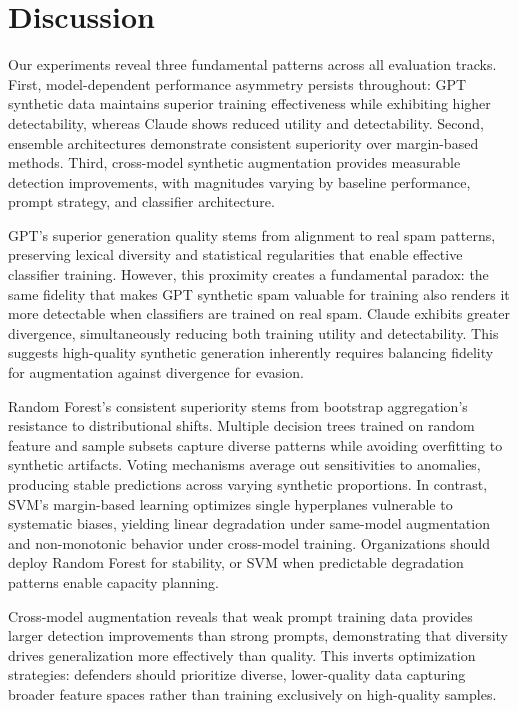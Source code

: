 \section{Discussion}
\label{sec:discussion}

Our experiments reveal three fundamental patterns across all evaluation tracks. First, model-dependent performance asymmetry persists throughout: GPT synthetic data maintains superior training effectiveness while exhibiting higher detectability, whereas Claude shows reduced utility and detectability. Second, ensemble architectures demonstrate consistent superiority over margin-based methods. Third, cross-model synthetic augmentation provides measurable detection improvements, with magnitudes varying by baseline performance, prompt strategy, and classifier architecture.

GPT's superior generation quality stems from alignment to real spam patterns, preserving lexical diversity and statistical regularities that enable effective classifier training. However, this proximity creates a fundamental paradox: the same fidelity that makes GPT synthetic spam valuable for training also renders it more detectable when classifiers are trained on real spam. Claude exhibits greater divergence, simultaneously reducing both training utility and detectability. This suggests high-quality synthetic generation inherently requires balancing fidelity for augmentation against divergence for evasion.

Random Forest's consistent superiority stems from bootstrap aggregation's resistance to distributional shifts. Multiple decision trees trained on random feature and sample subsets capture diverse patterns while avoiding overfitting to synthetic artifacts. Voting mechanisms average out sensitivities to anomalies, producing stable predictions across varying synthetic proportions. In contrast, SVM's margin-based learning optimizes single hyperplanes vulnerable to systematic biases, yielding linear degradation under same-model augmentation and non-monotonic behavior under cross-model training. Organizations should deploy Random Forest for stability, or SVM when predictable degradation patterns enable capacity planning.

Cross-model augmentation reveals that weak prompt training data provides larger detection improvements than strong prompts, demonstrating that diversity drives generalization more effectively than quality. This inverts optimization strategies: defenders should prioritize diverse, lower-quality data capturing broader feature spaces rather than training exclusively on high-quality samples.

